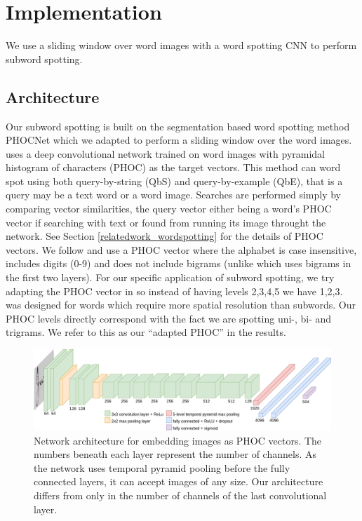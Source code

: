 \documentclass[ms,electronic,twosidetoc,letterpaper,chaptercenter,parttop,lof,lot]{byumsphd}
\begin{document}
\section{Implementation}

We use a sliding window over word images with a word spotting CNN to perform subword spotting.

\subsection{Architecture}

Our subword spotting is built on the segmentation based word spotting method PHOCNet \cite{sudholt2016, sudholt2017} which we adapted to perform a sliding window over the word images. \cite{sudholt2017} uses a deep convolutional network trained on word images with pyramidal histogram of characters (PHOC) \cite{Almazan2014} as the target vectors. This method can word spot using both query-by-string (QbS) and query-by-example (QbE), that is a query may be a text word or a word image. Searches are performed simply by comparing vector similarities, the query vector either being a word's PHOC vector if searching with text or found from running its image throught the network. See Section \ref{relatedwork_wordspotting} for the details of PHOC vectors. We follow \cite{sudholt2017} and use a PHOC vector where the alphabet is case insensitive, includes digits (0-9) and does not include bigrams (unlike \cite{Almazan2014} which uses bigrams in the first two layers). For our specific application of subword spotting, we try adapting the PHOC vector in \cite{sudholt2017} so instead of having levels 2,3,4,5 we have 1,2,3. \cite{sudholt2017} was designed for words which require more spatial resolution than subwords. Our PHOC levels directly correspond with the fact we are spotting uni-, bi- and trigrams. We refer to this as our ``adapted PHOC'' in the results.

\begin{figure}
    \centering
    \includegraphics[width=.98\textwidth]{thesis-phocnet}
    \caption{Network architecture for embedding images as PHOC vectors. The numbers beneath each layer represent the number of channels. As the network uses temporal pyramid pooling before the fully connected layers, it can accept images of any size. Our architecture differs from \cite{sudholt2017} only in the number of channels of the last convolutional layer.}
    \label{fig:network}
\end{figure}
\end{document}
